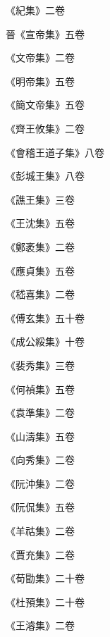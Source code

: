\begin{pinyinscope}
 《紀集》二卷



 晉《宣帝集》五卷



 《文帝集》二卷



 《明帝集》五卷



 《簡文帝集》五卷



 《齊王攸集》二卷



 《會稽王道子集》八卷



 《彭城王集》八卷



 《譙王集》三卷



 《王沈集》五卷



 《鄭袤集》二卷



 《應貞集》五卷



 《嵇喜集》二卷



 《傅玄集》五十卷



 《成公綏集》十卷



 《裴秀集》三卷



 《何禎集》五卷



 《袁準集》二卷



 《山濤集》五卷



 《向秀集》二卷



 《阮沖集》二卷



 《阮侃集》五卷



 《羊祜集》二卷



 《賈充集》二卷



 《荀勖集》二十卷



 《杜預集》二十卷



 《王濬集》二卷




\end{pinyinscope}
